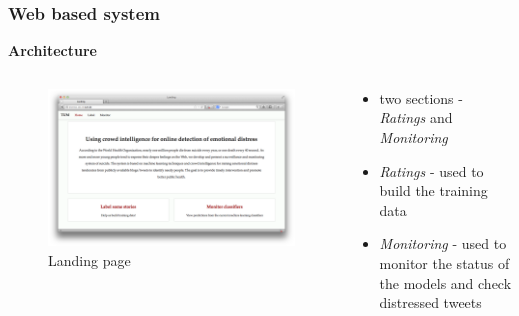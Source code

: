 \documentclass{beamer}
\begin{document}
    \begin{frame}
        \frametitle{Web based system}
        \begin{center}
            \textbf{Architecture}
        \end{center}
        \begin{columns}
            \begin{column}{0.5\textwidth}
                \begin{figure}
                    \centering
                    \includegraphics[width=\textwidth]{figures/landing.png}
                    \caption{Landing page}
                \end{figure}
            \end{column}
            \begin{column}{0.5\textwidth}
                \begin{itemize}
                    \item{two sections - \emph{Ratings} and \emph{Monitoring}}
                    \item{\emph{Ratings} - used to build the training data}
                    \item{\emph{Monitoring} - used to monitor the status of the models and check distressed tweets}
                \end{itemize}
            \end{column}
        \end{columns}
    \end{frame}
    
\end{document}
